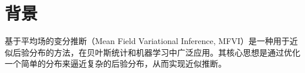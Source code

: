 \chapter{背景}

基于平均场的变分推断（Mean Field Variational Inference, MFVI）是一种用于近似后验分布的方法，在贝叶斯统计和机器学习中广泛应用。其核心思想是通过优化一个简单的分布来逼近复杂的后验分布，从而实现近似推断。

